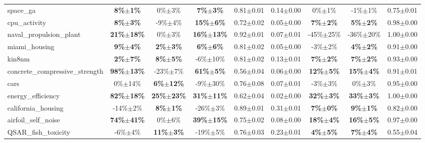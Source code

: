 \begin{table}[h]
\begin{small}
\begin{sc}
{\begin{tabular}{lcccccccc}
space\_ga  &  \textbf{8\%$\pm$1\%}  &  0\%$\pm$3\%  &  \textbf{7\%$\pm$3\%}  &  0.81$\pm$0.01  &  0.14$\pm$0.00  &  0\%$\pm$1\%  &  -1\%$\pm$1\%  &  0.75$\pm$0.01 \\
cpu\_activity  &  \textbf{8\%$\pm$3\%}  &  -9\%$\pm$4\%  &  \textbf{15\%$\pm$6\%}  &  0.72$\pm$0.02  &  0.05$\pm$0.00  &  \textbf{7\%$\pm$2\%}  &  \textbf{5\%$\pm$2\%}  &  0.98$\pm$0.00 \\
naval\_propulsion\_plant  &  \textbf{21\%$\pm$18\%}  &  0\%$\pm$3\%  &  \textbf{16\%$\pm$13\%}  &  0.92$\pm$0.01  &  0.07$\pm$0.01  &  -45\%$\pm$25\%  &  -36\%$\pm$20\%  &  1.00$\pm$0.00 \\
miami\_housing  &  \textbf{9\%$\pm$4\%}  &  \textbf{2\%$\pm$3\%}  &  \textbf{6\%$\pm$6\%}  &  0.81$\pm$0.02  &  0.05$\pm$0.00  &  -3\%$\pm$2\%  &  \textbf{4\%$\pm$2\%}  &  0.91$\pm$0.00 \\
kin8nm  &  \textbf{2\%$\pm$7\%}  &  \textbf{8\%$\pm$5\%}  &  -6\%$\pm$10\%  &  0.81$\pm$0.02  &  0.13$\pm$0.01  &  \textbf{7\%$\pm$2\%}  &  \textbf{7\%$\pm$2\%}  &  0.93$\pm$0.00 \\
concrete\_compressive\_strength  &  \textbf{98\%$\pm$13\%}  &  -23\%$\pm$7\%  &  \textbf{61\%$\pm$5\%}  &  0.56$\pm$0.04  &  0.06$\pm$0.00  &  \textbf{12\%$\pm$5\%}  &  \textbf{15\%$\pm$4\%}  &  0.91$\pm$0.01 \\
cars  &  0\%$\pm$14\%  &  \textbf{6\%$\pm$12\%}  &  -9\%$\pm$30\%  &  0.76$\pm$0.08  &  0.07$\pm$0.01  &  -3\%$\pm$3\%  &  0\%$\pm$3\%  &  0.95$\pm$0.00 \\
energy\_efficiency  &  \textbf{82\%$\pm$18\%}  &  \textbf{25\%$\pm$23\%}  &  \textbf{31\%$\pm$11\%}  &  0.62$\pm$0.04  &  0.02$\pm$0.00  &  \textbf{32\%$\pm$3\%}  &  \textbf{33\%$\pm$3\%}  &  1.00$\pm$0.00 \\
california\_housing  &  -14\%$\pm$2\%  &  \textbf{8\%$\pm$1\%}  &  -26\%$\pm$3\%  &  0.89$\pm$0.01  &  0.31$\pm$0.01  &  \textbf{7\%$\pm$0\%}  &  \textbf{9\%$\pm$1\%}  &  0.82$\pm$0.00 \\
airfoil\_self\_noise  &  \textbf{74\%$\pm$41\%}  &  0\%$\pm$6\%  &  \textbf{39\%$\pm$15\%}  &  0.75$\pm$0.02  &  0.08$\pm$0.00  &  \textbf{18\%$\pm$4\%}  &  \textbf{16\%$\pm$5\%}  &  0.97$\pm$0.00 \\
QSAR\_fish\_toxicity  &  -6\%$\pm$4\%  &  \textbf{11\%$\pm$3\%}  &  -19\%$\pm$5\%  &  0.76$\pm$0.03  &  0.23$\pm$0.01  &  \textbf{4\%$\pm$5\%}  &  \textbf{7\%$\pm$4\%}  &  0.55$\pm$0.04 \\

\bottomrule
\end{tabular}
}
\end{sc}
\end{small}
\end{table}
